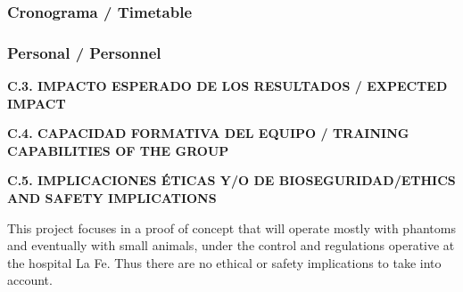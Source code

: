 \documentclass[a4paper,11pt,oneside]{article}
\begin{document}




\subsubsection*{Cronograma / Timetable}


%

\subsubsection*{Personal / Personnel}



\vspace{12pt}

\noindent\textbf{C.3. IMPACTO ESPERADO DE LOS RESULTADOS / EXPECTED IMPACT}



\vspace{12pt}

\noindent\textbf{C.4. CAPACIDAD FORMATIVA DEL EQUIPO / TRAINING CAPABILITIES OF THE GROUP}


%
%
%
%


\vspace{12pt}

\noindent\textbf{C.5. IMPLICACIONES ÉTICAS Y/O DE BIOSEGURIDAD/ETHICS AND SAFETY IMPLICATIONS}

This project focuses in a proof of concept that will operate mostly with phantoms and eventually with small animals, under the control and regulations operative at the hospital La Fe. Thus there are no ethical or safety implications to take into account. 
\end{document}
